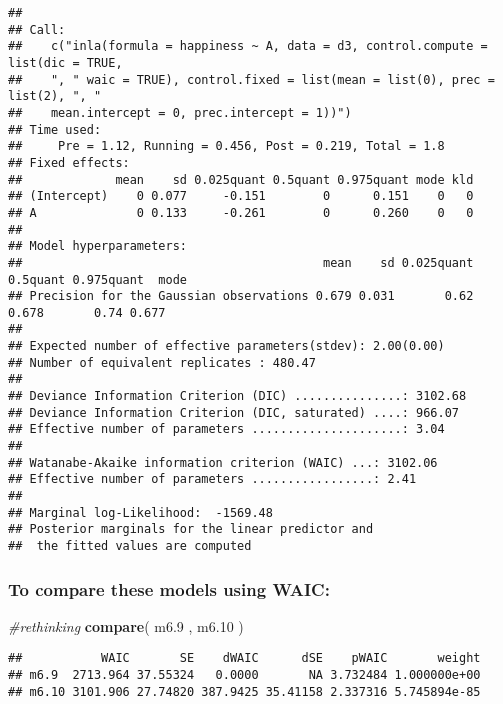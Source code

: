 \documentclass[
]{article}
\newenvironment{Shaded}{\begin{snugshade}}{\end{snugshade}}
\newcommand{\CommentTok}[1]{\textcolor[rgb]{0.56,0.35,0.01}{\textit{#1}}}
\newcommand{\FloatTok}[1]{\textcolor[rgb]{0.00,0.00,0.81}{#1}}
\newcommand{\KeywordTok}[1]{\textcolor[rgb]{0.13,0.29,0.53}{\textbf{#1}}}
\newcommand{\NormalTok}[1]{#1}
\newcommand{\OperatorTok}[1]{\textcolor[rgb]{0.81,0.36,0.00}{\textbf{#1}}}
\begin{document}
\begin{verbatim}
## 
## Call:
##    c("inla(formula = happiness ~ A, data = d3, control.compute = list(dic = TRUE, 
##    ", " waic = TRUE), control.fixed = list(mean = list(0), prec = list(2), ", " 
##    mean.intercept = 0, prec.intercept = 1))") 
## Time used:
##     Pre = 1.12, Running = 0.456, Post = 0.219, Total = 1.8 
## Fixed effects:
##             mean    sd 0.025quant 0.5quant 0.975quant mode kld
## (Intercept)    0 0.077     -0.151        0      0.151    0   0
## A              0 0.133     -0.261        0      0.260    0   0
## 
## Model hyperparameters:
##                                          mean    sd 0.025quant 0.5quant 0.975quant  mode
## Precision for the Gaussian observations 0.679 0.031       0.62    0.678       0.74 0.677
## 
## Expected number of effective parameters(stdev): 2.00(0.00)
## Number of equivalent replicates : 480.47 
## 
## Deviance Information Criterion (DIC) ...............: 3102.68
## Deviance Information Criterion (DIC, saturated) ....: 966.07
## Effective number of parameters .....................: 3.04
## 
## Watanabe-Akaike information criterion (WAIC) ...: 3102.06
## Effective number of parameters .................: 2.41
## 
## Marginal log-Likelihood:  -1569.48 
## Posterior marginals for the linear predictor and
##  the fitted values are computed
\end{verbatim}

\hypertarget{to-compare-these-models-using-waic}{%
\subsubsection{To compare these models using
WAIC:}\label{to-compare-these-models-using-waic}}

\begin{Shaded}
\begin{Highlighting}[]
\CommentTok{#rethinking}
 \KeywordTok{compare}\NormalTok{( m6}\FloatTok{.9}\NormalTok{ , m6}\FloatTok{.10}\NormalTok{ )}
\end{Highlighting}
\end{Shaded}

\begin{verbatim}
##           WAIC       SE    dWAIC      dSE    pWAIC       weight
## m6.9  2713.964 37.55324   0.0000       NA 3.732484 1.000000e+00
## m6.10 3101.906 27.74820 387.9425 35.41158 2.337316 5.745894e-85
\end{verbatim}

\begin{Shaded}
\end{Shaded}
\end{document}
